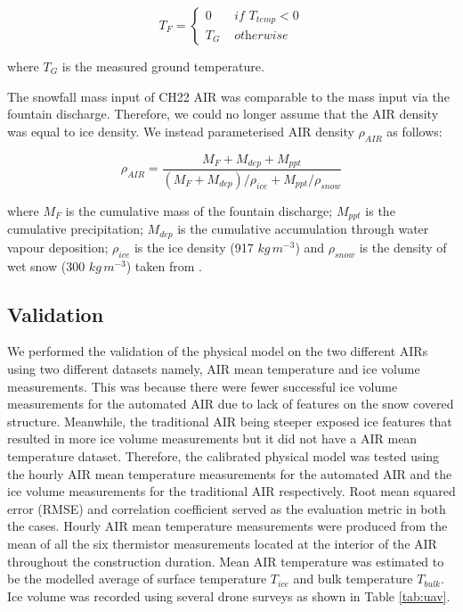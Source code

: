 \documentclass[tc, manuscript]{copernicus}
\begin{document}
\begin{equation}
	T_{F} = \left\{ \begin{array}{ll}
		0 & \textit{ if } T_{temp} < 0 \\
		T_{G} & \textit{ otherwise}
	\end{array} \right.
\end{equation}

where $T_{G}$ is the measured ground temperature.

The snowfall mass input of CH22 AIR was comparable to the mass input via the fountain discharge. Therefore, we
could no longer assume that the AIR density was equal to ice density. We instead parameterised AIR density
$\rho_{AIR}$ as follows:

\begin{equation}
  \rho_{AIR} = \frac{M_{F} + M_{dep} + M_{ppt}}{(M_{F} + M_{dep})/\rho_{ice} + M_{ppt}/\rho_{snow}}
\end{equation}

where $M_F$ is the cumulative mass of the fountain discharge; $M_{ppt}$ is the cumulative precipitation;
$M_{dep}$ is the cumulative accumulation through water vapour deposition; $\rho_{ice}$ is the ice density (917
$kg\,m^{-3}$) and $\rho_{snow}$ is the density of wet snow (300 $kg\,m^{-3}$) taken from
\cite{cuffeyPhysicsGlaciers2010} .

\subsection{Validation}
We performed the validation of the physical model on the two different AIRs using two different datasets namely,
AIR mean temperature and ice volume measurements. This was because there were fewer successful ice volume
measurements for the automated AIR due to lack of features on the snow covered structure. Meanwhile, the traditional
AIR being steeper exposed ice features that resulted in more ice volume measurements but it did not have a AIR
mean temperature dataset. Therefore, the calibrated physical model was tested using the hourly AIR mean temperature
measurements for the automated AIR and the ice volume measurements for the traditional AIR respectively. Root
mean squared error (RMSE) and correlation coefficient served as the evaluation metric in both the cases. Hourly
AIR mean temperature measurements were produced from the mean of all the six thermistor measurements located at the
interior of the AIR throughout the construction duration. Mean AIR temperature was estimated to be the modelled
average of surface temperature $T_{ice}$ and bulk temperature $T_{bulk}$. Ice volume was recorded using several
drone surveys as shown in Table \ref{tab:uav}.
\end{document}
